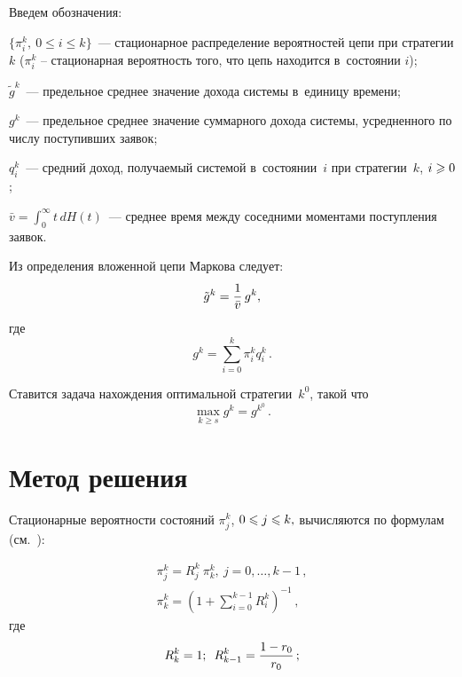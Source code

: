 \begin{multicols}{2}
Введем обозначения:
\begin{description}
\item
$\{\pi_i^k,\ 0\leqslant i\leqslant k\}$~--- стационарное распределение
вероятностей цепи при стратегии $k$ ($\pi_i^k$ -- стационарная
вероятность того, что цепь находится в~состоянии $i$);\\[-14.5pt]
\item
$\tilde{g}^k$~--- предельное среднее значение дохода системы в~единицу времени;\\[-14.5pt]
\item
$g^k$~--- предельное среднее значение суммарного дохода системы,
усредненного по числу поступивших заявок;\\[-14.5pt]
\item
$q_i^k$~--- средний доход, получаемый системой в~состоянии~$i$ при
стратегии~$k$, $i\hm\geqslant 0$;\\[-14.5pt]
\item
$\bar{v}=\int\nolimits_0^{\infty}t\,dH(t)$~--- среднее время между
соседними моментами поступления заявок.
\end{description}

Из определения вложенной цепи Маркова следует:
\begin{equation}
\tilde{g}^k=\displaystyle\frac{\displaystyle 1\mathstrut}{\displaystyle \bar{v}\mathstrut}\,g^k,
\label{1} 
\end{equation}
где
$$
g^k=\sum\limits_{i=0}^k\pi_i^kq_i^k\,.
$$


Ставится задача нахождения оптимальной стратегии~$k^0$, такой что
\begin{equation*}
 \max\limits_{k\geqslant s}g^k=g^{k^0}\,.
\end{equation*}

\vspace*{-6pt}

\section{Метод решения}

Стационарные вероятности состояний  $\pi_j^k$, $0\hm\leqslant j\hm\leqslant k,$ 
вычисляются по формулам (см.~\cite{8-aga, 9-aga}):

\noindent
\begin{multline}
\label{3}
\pi_j^k=R_j^k\:\pi_k^k,\ j=0,\ldots,k-1\,,\\ \pi_k^k=
\left(1+\sum\limits_{i=0}^{k-1}R_i^k\right)^{-1}\,,
\end{multline}
где
\begin{equation*}
R_k^k=1;\enskip R_{k-1}^k=\displaystyle\frac{\displaystyle 1-r_0\mathstrut}{\displaystyle r_0\mathstrut}\,;
\end{equation*}


\end{multicols}
